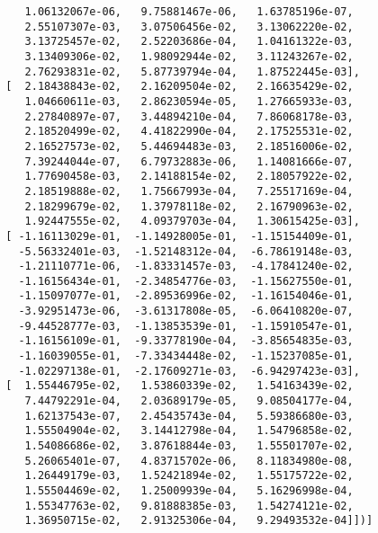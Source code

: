 \documentclass[11pt,a4j,fleqn]{jarticle}
\begin{document}
\begin{verbatim}
          1.06132067e-06,   9.75881467e-06,   1.63785196e-07,
          2.55107307e-03,   3.07506456e-02,   3.13062220e-02,
          3.13725457e-02,   2.52203686e-04,   1.04161322e-03,
          3.13409306e-02,   1.98092944e-02,   3.11243267e-02,
          2.76293831e-02,   5.87739794e-04,   1.87522445e-03],
       [  2.18438843e-02,   2.16209504e-02,   2.16635429e-02,
          1.04660611e-03,   2.86230594e-05,   1.27665933e-03,
          2.27840897e-07,   3.44894210e-04,   7.86068178e-03,
          2.18520499e-02,   4.41822990e-04,   2.17525531e-02,
          2.16527573e-02,   5.44694483e-03,   2.18516006e-02,
          7.39244044e-07,   6.79732883e-06,   1.14081666e-07,
          1.77690458e-03,   2.14188154e-02,   2.18057922e-02,
          2.18519888e-02,   1.75667993e-04,   7.25517169e-04,
          2.18299679e-02,   1.37978118e-02,   2.16790963e-02,
          1.92447555e-02,   4.09379703e-04,   1.30615425e-03],
       [ -1.16113029e-01,  -1.14928005e-01,  -1.15154409e-01,
         -5.56332401e-03,  -1.52148312e-04,  -6.78619148e-03,
         -1.21110771e-06,  -1.83331457e-03,  -4.17841240e-02,
         -1.16156434e-01,  -2.34854776e-03,  -1.15627550e-01,
         -1.15097077e-01,  -2.89536996e-02,  -1.16154046e-01,
         -3.92951473e-06,  -3.61317808e-05,  -6.06410820e-07,
         -9.44528777e-03,  -1.13853539e-01,  -1.15910547e-01,
         -1.16156109e-01,  -9.33778190e-04,  -3.85654835e-03,
         -1.16039055e-01,  -7.33434448e-02,  -1.15237085e-01,
         -1.02297138e-01,  -2.17609271e-03,  -6.94297423e-03],
       [  1.55446795e-02,   1.53860339e-02,   1.54163439e-02,
          7.44792291e-04,   2.03689179e-05,   9.08504177e-04,
          1.62137543e-07,   2.45435743e-04,   5.59386680e-03,
          1.55504904e-02,   3.14412798e-04,   1.54796858e-02,
          1.54086686e-02,   3.87618844e-03,   1.55501707e-02,
          5.26065401e-07,   4.83715702e-06,   8.11834980e-08,
          1.26449179e-03,   1.52421894e-02,   1.55175722e-02,
          1.55504469e-02,   1.25009939e-04,   5.16296998e-04,
          1.55347763e-02,   9.81888385e-03,   1.54274121e-02,
          1.36950715e-02,   2.91325306e-04,   9.29493532e-04]])]


\end{verbatim}
\end{document}

